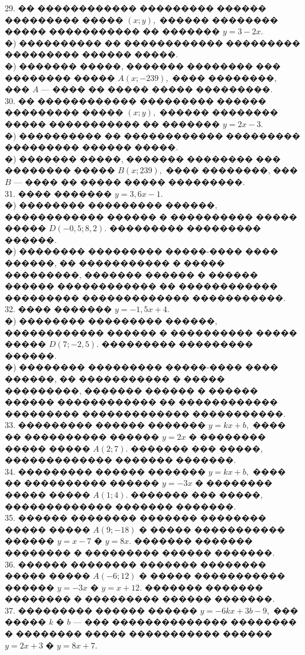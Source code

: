 \documentclass[12pt]{article}
\begin{document}
29. �� ������������ ��������� ������ ��������� ����� $(x;y),$ ������ �������� ����� ����������� �� ������� $y=3-2x.$\\
�) ���������� �� ������������ ��������� ��������� ������ �����.\\
�) ������� �����, ������� �������� ��� �������� ����� $A(x;-239),$ ���� ��������, ��� $A$ --- ���� �� ����� ����� ���������.\\
30. �� ������������ ��������� ������ ��������� ����� $(x;y),$ ������ �������� ����� ����������� �� ������� $y=2x-3.$\\
�) ���������� �� ������������ ��������� ��������� ������ �����.\\
�) ������� �����, ������� �������� ��� �������� ����� $B(x;239),$ ���� ��������, ��� $B$ --- ���� �� ����� ����� ���������.\\
31. ���� ������� $y=3,6x-1.$\\
�) �������� ��������� ������, ������������ ������ � ���������� ����� ����� $D(-0,5;8,2).$ ��������� ��������� ������.\\
�) �������� ��������� �����-���� ���� ������, �� ����������� � ����� ���������, ������� ������ � ������ ������ ������������ �� ������������ ��������� ������������� �����������.\\
32. ���� ������� $y=-1,5x+4.$\\
�) �������� ��������� ������, ������������ ������ � ���������� ����� ����� $D(7;-2,5).$ ��������� ��������� ������.\\
�) �������� ��������� �����-���� ���� ������, �� ����������� � ����� ���������, ������� ������ � ������ ������ ������������ �� ������������ ��������� ������������� �����������.\\
33. ��������� ������ ������� $y=kx+b,$ ���� �� ���������� ������ $y=2x$ � �������� ����� ����� $A(2;7).$ ������� ��� �����, ������������� ������� �������.\\
34. ��������� ������ ������� $y=kx+b,$ ���� �� ���������� ������ $y=-3x$ � �������� ����� ����� $A(1;4).$ ������� ��� �����, ������������� ������� �������.\\
35. ������ �������� ������� �������� ����� ����� $A(9;-18)$ � ����� ����������� ������ $y=x-7$ � $y=8x.$ ������� ������� �������� � ��������� ������ �������.\\
36. ������ �������� ������� �������� ����� ����� $A(-6;12)$ � ����� ����������� ������ $y=-3x$ � $y=x+12.$ ������� ������� �������� � ��������� ������ �������.\\
37. ��������� ������ ������ $y=-6kx+3b-9,$ ��� ����� $k$ � $b$ --- ��� �������������� �������� � �������� ����� ����������� ������ $y=2x+3$ � $y=8x+7.$\\
\end{document}
